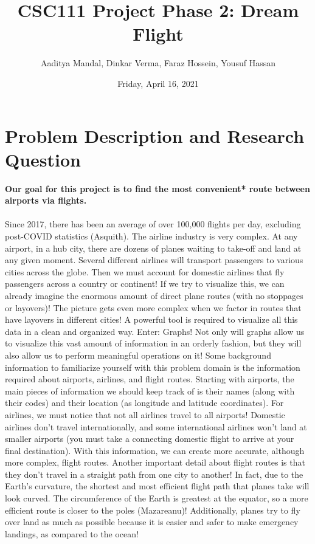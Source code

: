 \documentclass[fontsize=11pt]{article}
\title{CSC111 Project Phase 2: Dream Flight}
\author{Aaditya Mandal, Dinkar Verma, Faraz Hossein, Yousuf Hassan}
\date{Friday, April 16, 2021}
\begin{document}
\maketitle

\section*{Problem Description and Research Question}

\textbf{Our goal for this project is to find the most convenient* route between airports via flights.}\\
\\
Since 2017, there has been an average of over 100,000 flights per day, excluding post-COVID statistics (Asquith). The airline industry is very complex. At any airport, in a hub city, there are dozens of planes waiting to take-off and land at any given moment. Several different airlines will transport passengers to various cities across the globe. Then we must account for domestic airlines that fly passengers across a country or continent! If we try to visualize this, we can already imagine the enormous amount of direct plane routes (with no stoppages or layovers)! The picture gets even more complex when we factor in routes that have layovers in different cities! A powerful tool is required to visualize all this data in a clean and organized way. Enter: Graphs! Not only will graphs allow us to visualize this vast amount of information in an orderly fashion, but they will also allow us to perform meaningful operations on it! Some background information to familiarize yourself with this problem domain is the information required about airports, airlines, and flight routes. Starting with airports, the main pieces of information we should keep track of is their names (along with their codes) and their location (as longitude and latitude coordinates). For airlines, we must notice that not all airlines travel to all airports! Domestic airlines don’t travel internationally, and some international airlines won’t land at smaller airports (you must take a connecting domestic flight to arrive at your final destination). With this information, we can create more accurate, although more complex, flight routes. Another important detail about flight routes is that they don’t travel in a straight path from one city to another! In fact, due to the Earth’s curvature, the shortest and most efficient flight path that planes take will look curved. The circumference of the Earth is greatest at the equator, so a more efficient route is closer to the poles (Mazareanu)! Additionally, planes try to fly over land as much as possible because it is easier and safer to make emergency landings, as compared to the ocean! \\
\end{document}
